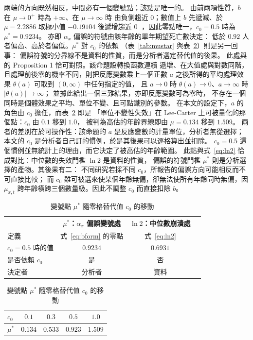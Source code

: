 \documentclass[UTF8, fontset=macnew, a4paper, 12pt]{ctexart}
\begin{document}
兩端的方向既然相反，中間必有一個變號點；該點是唯一的。
由前兩項性質，$b$ 在 $\mu\to0^{+}$ 時為 $+\infty$、在 $\mu\to\infty$ 時
由負側趨近 $0$；數值上 $b$ 先遞減、於 $\mu=2.2886$ 取極小值 $-0.19104$
後遞增趨近 $0^{-}$，因此零點唯一，$c_0=0.5$ 時為 $\mu^\ast=0.9234$。
亦即 $\alpha_x$ 偏誤的符號由該年齡的單年期望死亡數決定：
低於 $0.92$ 人者偏高、高於者偏低。$\mu^\ast$ 對 $c_0$ 的依賴
（表~\ref{tab:mustar} 與表~\ref{tab:c0shift}）則是另一回事：
偏誤符號的分界線不是資料的性質，而是分析者選定替代值的後果。
此處與 \citet{chenroth2024} 的 Proposition 1 恰可對照。該命題設轉換函數連續
遞增、在大值處與對數同階，且處理前後零的機率不同，則把反應變數乘上一個正數
$a$ 之後所得的平均處理效果 $\theta(a)$ 可取到 $(0,\infty)$ 中任何指定的值，
且 $a\to0$ 時 $\theta(a)\to0$、$a\to\infty$ 時 $|\theta(a)|\to\infty$；
並據此給出一個三難結果，亦即反應變數可為零時，
不存在一個同時是個體效果之平均、單位不變、且可點識別的參數。
在本文的設定下，$a$ 的角色由 $c_0$ 擔任，而表~\ref{tab:c0shift} 即是
「單位不變性失效」在 Lee-Carter 上可被量化的那個點：$c_0$ 由 $0.1$ 移到 $1.0$，
被判為高估的年齡界線即由 $\mu=0.134$ 移到 $1.509$。
兩者的差別在於可操作性：該命題的 $a$ 是反應變數的計量單位，分析者無從選擇；
本文的 $c_0$ 是分析者自己訂的慣例，於是其後果可以逐格算出並扣除。
$c_0=0.5$ 這個慣例並無統計上的理由，而它決定了被高估的年齡範圍。
此點與式~\eqref{eq:ln2} 恰成對比：中位數的失效門檻 $\ln 2$ 是資料的性質，
偏誤的符號門檻 $\mu^\ast$ 則是分析選擇的產物。其後果有二：
不同研究若採不同 $c_0$，所報告的偏誤方向可能相反而不可直接比較；
而 $c_0$ 雖可被選來使某個年齡無偏，卻無法使所有年齡同時無偏，因 $\mu_{x,t}$ 跨年齡橫跨三個數量級。因此不調整 $c_0$ 而直接扣除 $b$。

\begin{table}[H]
\centering
\caption{兩個門檻的比較}
\small
\renewcommand{\arraystretch}{1.2}
\begin{tabular}{lccc}
\toprule
 & $\mu^{\ast}$：$\alpha_x$ 偏誤變號處 & $\ln 2$：中位數崩潰處\\
\midrule
定義            & 式~\eqref{eq:bform} 的零點 & 式~\eqref{eq:ln2}\\
$c_0=0.5$ 時的值 & $0.9234$ & $0.6931$\\
是否依賴 $c_0$   & 是       & 否\\
決定者          & 分析者   & 資料\\
\bottomrule
\end{tabular}
\label{tab:mustar}

\vspace{6pt}
\caption{變號點 $\mu^{\ast}$ 隨零格替代值 $c_0$ 的移動}
\small
\begin{tabular}{lcccc}
\toprule
$c_0$       & $0.1$ & $0.3$ & $0.5$ & $1.0$\\
\midrule
$\mu^{\ast}$ & $0.134$ & $0.533$ & $0.923$ & $1.509$\\
\bottomrule
\end{tabular}
\label{tab:c0shift}
\end{table}
\end{document}
